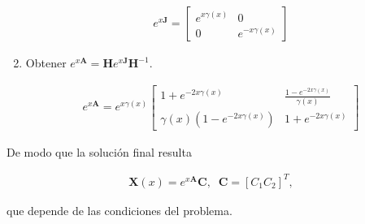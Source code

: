 \begin{enumerate}
	\begin{align}
	e^{x\textbf{J}} =  
	\begin{bmatrix}
	e^{x \gamma(x)} & 0 \\
	0 & e^{-x \gamma(x)}
	\end{bmatrix}
	\end{align}
	
	\item Obtener $e^{x\textbf{A}} = \textbf{H} e^{x\textbf{J}} \textbf{H}^{-1}$.
	
	\begin{align}
	e^{x\textbf{A}} =  e^{x\gamma(x)}
	\begin{bmatrix}
	1+e^{-2x \gamma(x)} & \frac{1-e^{-2x\gamma(x)}}{\gamma(x)} \\
	\gamma(x) (1-e^{-2x\gamma(x)}) & 1+e^{-2x \gamma(x)}
	\end{bmatrix}
	\end{align}
	
\end{enumerate}

De modo que la solución final resulta

\begin{align}
\textbf{X}(x) = e^{x\textbf{A}} \textbf{C}, \;\;\textbf{C} = [C_1 C_2]^{T},
\end{align}

que depende de las condiciones del problema.